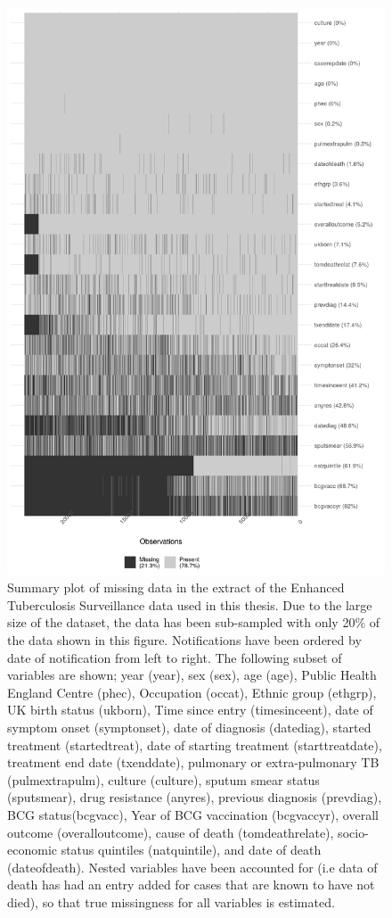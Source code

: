 \documentclass[11pt,twoside]{bristolthesis}
\begin{document}
  \begin{figure}
  
  {\centering \includegraphics[width=0.6\linewidth]{chapters/tb-epi-england/figures/plot-missing-struct} 
  
  }
  
  \caption{Summary plot of missing data in the extract of the Enhanced Tuberculosis Surveillance data used in this thesis. Due to the large size of the dataset, the data has been sub-sampled with only 20\% of the data shown in this figure. Notifications have been ordered by date of notification from left to right. The following subset of variables are shown; year (year), sex (sex), age (age), Public Health England Centre (phec), Occupation (occat), Ethnic group (ethgrp), UK birth status (ukborn), Time since entry (timesinceent), date of symptom onset (symptonset), date of diagnosis (datediag), started treatment (startedtreat), date of starting treatment (starttreatdate), treatment end date (txenddate), pulmonary or extra-pulmonary TB (pulmextrapulm), culture (culture), sputum smear status (sputsmear), drug resistance (anyres), previous diagnosis (prevdiag), BCG status(bcgvacc), Year of BCG vaccination (bcgvaccyr), overall outcome (overalloutcome), cause of death (tomdeathrelate), socio-economic status quintiles (natquintile), and date of death (dateofdeath). Nested variables have been accounted for (i.e data of death has had an entry added for cases that are known to have not died), so that true missingness for all variables is estimated.}\label{fig:plot-missing-struct}
  \end{figure}
\end{document}
